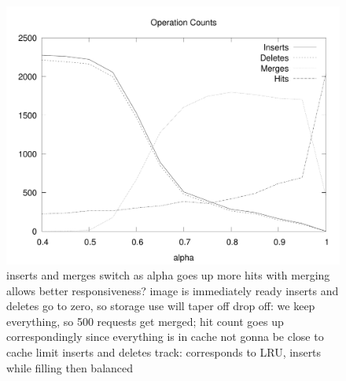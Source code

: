 \documentclass[sigconf]{acmart}
\begin{document}
\begin{figure}
\includegraphics[width=\linewidth]{curated/comparative/operation_count.pdf}
\label{fig:opcounts}
inserts and merges switch as alpha goes up
more hits with merging
allows better responsiveness? image is immediately ready
inserts and deletes go to zero, so storage use will taper off
drop off: we keep everything, so 500 requests get merged; hit count goes up correspondingly since everything is in cache
not gonna be close to cache limit
inserts and deletes track: corresponds to LRU, inserts while filling then balanced
\fi
\end{figure}
\end{document}
